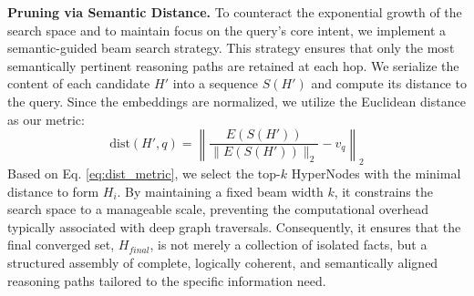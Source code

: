\textbf{Pruning via Semantic Distance.} To counteract the exponential growth of the search space and to maintain focus on the query's core intent, we implement a semantic-guided beam search strategy. This strategy ensures that only the most semantically pertinent reasoning paths are retained at each hop. We serialize the content of each candidate $H'$ into a sequence $S(H')$ and compute its distance to the query. Since the embeddings are normalized, we utilize the Euclidean distance as our metric:
\begin{equation}
    \label{eq:dist_metric}
    \text{dist}(H', q) = \left\| \frac{E(S(H'))}{\|E(S(H'))\|_2} - v_q \right\|_2
\end{equation}
Based on Eq. \eqref{eq:dist_metric}, we select the top-$k$ HyperNodes with the minimal distance to form $H_{i}$. By maintaining a fixed beam width $k$, it constrains the search space to a manageable scale, preventing the computational overhead typically associated with deep graph traversals. Consequently, it ensures that the final converged set, $H_{final}$, is not merely a collection of isolated facts, but a structured assembly of complete, logically coherent, and semantically aligned reasoning paths tailored to the specific information need.

